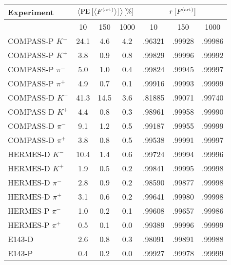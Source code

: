 \begin{tabular}{lccc@{\hspace{1cm}}ccc}
  \toprule \toprule
   Experiment    & \multicolumn{3}{c}{$\left< \textrm{PE} \left[ \left<F^{\textrm{(art)}} \right>  \right] \right> [\%]$} & \multicolumn{3}{c}{$r \left[ F^{\textrm{(art)}} \right]$}\\[10pt]
  \toprule
                      &    10     &     150   &    1000  &    10     &     150   &    1000  \\
  \midrule
      COMPASS-P $K^-$   &   24.1    &     4.6   &    4.2   &  .96321  &  .99928  &  .99986 \\
      COMPASS-P $K^+$   &    3.8    &     0.9   &    0.8   &  .99829  &  .99996  &  .99992 \\
    COMPASS-P $\pi^-$   &    5.0    &     1.0   &    0.4   &  .99824  &  .99945  &  .99997 \\
    COMPASS-P $\pi^+$   &    4.9    &     0.7   &    0.1   &  .99916  &  .99993  &  .99999 \\
      COMPASS-D $K^-$   &   41.3    &    14.5   &    3.6   &  .81885  &  .99071  &  .99740 \\
      COMPASS-D $K^+$   &    4.4    &     0.8   &    0.3   &  .98961  &  .99958  &  .99990 \\
    COMPASS-D $\pi^-$   &    9.1    &     1.2   &    0.5   &  .99187  &  .99955  &  .99999 \\
    COMPASS-D $\pi^+$   &    3.8    &     0.8   &    0.5   &  .99538  &  .99991  &  .99997 \\
      HERMES-D  $K^-$   &   10.4    &     1.4   &    0.6   &  .99724  &  .99994  &  .99996 \\
      HERMES-D  $K^+$   &    1.9    &     0.5   &    0.2   &  .99841  &  .99995  &  .99998 \\
    HERMES-D  $\pi^-$   &    2.8    &     0.9   &    0.2   &  .98590  &  .99877  &  .99998 \\
    HERMES-D  $\pi^+$   &    3.1    &     0.6   &    0.2   &  .99641  &  .99980  &  .99998 \\
    HERMES-P  $\pi^-$   &    1.0    &     0.2   &    0.1   &  .99608  &  .99657  &  .99986 \\
    HERMES-P  $\pi^+$   &    0.5    &     0.1   &    0.0   &  .99389  &  .99996  &  .99999 \\
               E143-D   &    2.6    &     0.8   &    0.3   &  .98091  &  .99891  &  .99988 \\
               E143-P   &    0.4    &     0.2   &    0.0   &  .99927  &  .99978  &  .99999 \\

\end{tabular}
